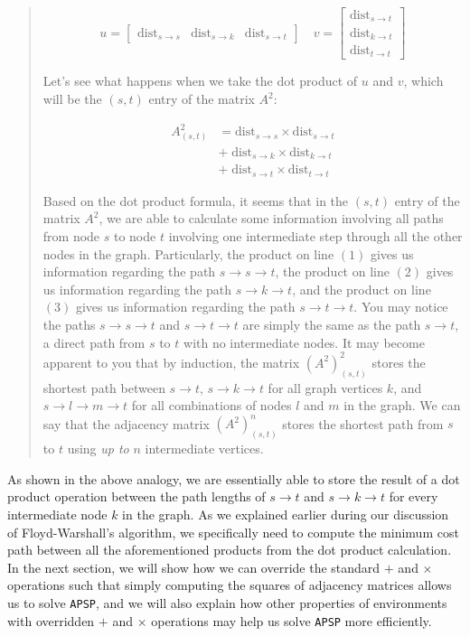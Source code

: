 \documentclass[12pt]{article}
\begin{document}
\begin{quote}
    \[
        u =
        \begin{bmatrix}
            \mathrm{dist}_{s \to s} & \mathrm{dist}_{s \to k} & \mathrm{dist}_{s \to t}
        \end{bmatrix}
        \quad
        v =
        \begin{bmatrix}
            \mathrm{dist}_{s \to t} \\
            \mathrm{dist}_{k \to t} \\
            \mathrm{dist}_{t \to t}
        \end{bmatrix}
    \]

    Let's see what happens when we take the dot product of $u$ and $v$, which will be the $(s, t)$ entry of the matrix $A^2$:

    \begin{eqnarray}
        A^2_{(s,t)}
        &= \mathrm{dist}_{s \to s} \times \mathrm{dist}_{s \to t} \\
        &+ \; \mathrm{dist}_{s \to k} \times \mathrm{dist}_{k \to t} \\
        &+ \; \mathrm{dist}_{s \to t} \times \mathrm{dist}_{t \to t}
    \end{eqnarray}

    Based on the dot product formula, it seems that in the $(s, t)$ entry of the matrix $A^2$, we are able to calculate some information involving all paths from node $s$ to node $t$ involving one intermediate step through all the other nodes in the graph. Particularly, the product on line $(1)$ gives us information regarding the path $s \to s \to t$, the product on line $(2)$ gives us information regarding the path $s \to k \to t$, and the product on line $(3)$ gives us information regarding the path $s \to t \to t$. You may notice the paths $s \to s \to t$ and $s \to t \to t$ are simply the same as the path $s \to t$, a direct path from $s$ to $t$ with no intermediate nodes. It may become apparent to you that by induction, the matrix $(A^2)^2_{(s, t)}$ stores the shortest path between $s \to t$, $s \to k \to t$ for all graph vertices $k$, and $s \to l \to m \to t$ for all combinations of nodes $l$ and $m$ in the graph. We can say that the adjacency matrix $(A^2)^n_{(s, t)}$ stores the shortest path from $s$ to $t$ using \emph{up to} $n$ intermediate vertices.
\end{quote}

As shown in the above analogy, we are essentially able to store the result of a dot product operation between the path lengths of $s \to t$ and $s \to k \to t$ for every intermediate node $k$ in the graph. As we explained earlier during our discussion of Floyd-Warshall's algorithm, we specifically need to compute the minimum cost path between all the aforementioned products from the dot product calculation. In the next section, we will show how we can override the standard $+$ and $\times$ operations such that simply computing the squares of adjacency matrices allows us to solve \texttt{APSP}, and we will also explain how other properties of environments with overridden $+$ and $\times$ operations may help us solve \texttt{APSP} more efficiently.
\end{document}
